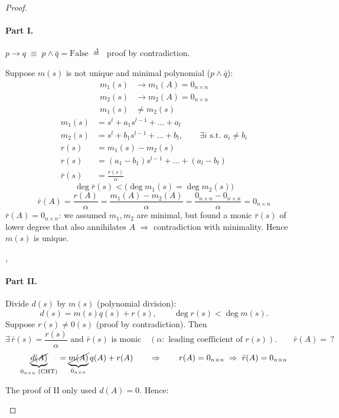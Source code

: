 \begin{proof}
\paragraph{Part I.} $p\to q \;\equiv\; p\wedge\bar q=\text{False} \;\stackrel{\Delta}{=}\;$ proof by contradiction.

Suppose $m(s)$ is not unique and minimal polynomial ($p\wedge\bar q$):
\begin{align*}
m_1(s) &\longrightarrow m_1(A)=0_{n\times n}\\
m_2(s) &\longrightarrow m_2(A)=0_{n\times n}\\
m_1(s)&\neq m_2(s)
\end{align*}
\begin{align*}
m_1(s)&=s^l+a_1s^{l-1}+\dots+a_l\\
m_2(s)&=s^l+b_1s^{l-1}+\dots+b_l, \qquad \exists i \text{ s.t. } a_i\neq b_i\\
r(s)&=m_1(s)-m_2(s)\\
r(s)&=(a_1-b_1)s^{l-1}+\dots+(a_l-b_l)\\
\bar r(s)&=\frac{r(s)}{\alpha}
\end{align*}
\[ \deg\bar r(s) < \big(\deg m_1(s)=\deg m_2(s)\big) \]
\[
\bar r(A)=\frac{r(A)}{\alpha}=\frac{m_1(A)-m_2(A)}{\alpha}=\frac{0_{n\times n}-0_{n\times n}}{\alpha}=0_{n\times n}
\]
$\bar r(A)=0_{n\times n}$: we assumed $m_1,m_2$ are minimal, but found a monic $\bar r(s)$ of lower degree that also annihilates $A$ $\Rightarrow$ contradiction with minimality. Hence $m(s)$ is unique.

\sep
\paragraph{Part II.} Divide $d(s)$ by $m(s)$ (polynomial division):
\[ d(s)=m(s)q(s)+r(s), \qquad \deg r(s)<\deg m(s). \]
Suppose $r(s)\neq 0(s)$ (proof by contradiction). Then
\[ \exists\,\bar r(s)=\frac{r(s)}{\alpha}\text{ and }\bar r(s)\text{ is monic}\quad(\alpha:\text{ leading coefficient of } r(s)).\qquad \bar r(A)=\,? \]
\[
\underbrace{\cancel{d(A)}}_{0_{n\times n}\text{ (CHT)}}=\underbrace{\cancel{m(A)}}_{0_{n\times n}}q(A)+r(A)\qquad\Rightarrow\qquad r(A)=0_{n\times n}\;\Rightarrow\;\bar r(A)=0_{n\times n}
\]
\begin{insight}
The proof of II only used $d(A)=0$. Hence: 
\end{insight}


\end{proof}
